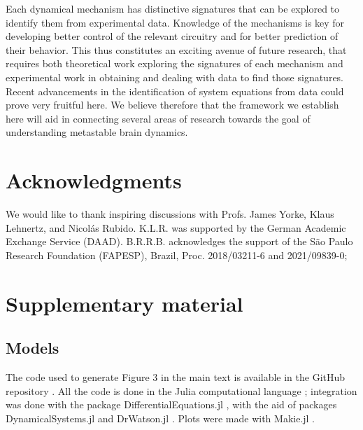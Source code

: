\documentclass[reprint,onecolumn,superscriptaddress,showpacs,amsmath,amssymb,aps,floatfix]{revtex4-2}
\theoremstyle{definition}
\begin{document}
Each dynamical mechanism has distinctive signatures that can be explored to identify them from experimental data. Knowledge of the mechanisms is key for developing better control of the relevant circuitry and for better prediction of their behavior. This thus constitutes an exciting avenue of future research, that requires both theoretical work exploring the signatures of each mechanism and experimental work in obtaining and dealing with data to find those signatures. Recent advancements in the identification of system equations from data \cite{voss2004nonlinear, brunton2016discovering, tabar2019analysis, anvari2016disentangling} could prove very fruitful here. We believe therefore that the framework we establish here will aid in connecting several areas of research towards the goal of understanding metastable brain dynamics. 






\section{Acknowledgments}
We would like to thank inspiring discussions with Profs. James Yorke, Klaus Lehnertz, and Nicolás Rubido. K.L.R. was supported by the German Academic Exchange Service (DAAD). B.R.R.B. acknowledges the support of the São Paulo Research Foundation (FAPESP), Brazil, Proc. 2018/03211-6 and 2021/09839-0;

\section*{Supplementary material}
\subsection{Models}
The code used to generate Figure 3 in the main text is available in the GitHub repository \cite{rossi2022repository}. All the code is done in the Julia computational language \cite{bezanson2017julia}; integration was done with the package DifferentialEquations.jl \cite{rackauckas2016differential}, with the aid of packages DynamicalSystems.jl \cite{datseris2018dynamical} and DrWatson.jl \cite{datseris2020drwatson}. Plots were made with Makie.jl \cite{danisch2021makie}.
\end{document}
